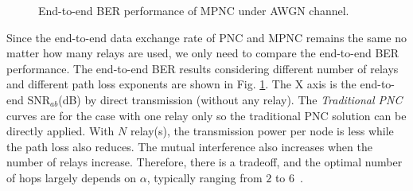 \begin{figure} [th]
    \centering
    \caption{End-to-end BER performance of MPNC under AWGN channel.}\label{ber-D-MPNC}
\end{figure}

Since the end-to-end data exchange rate of PNC and MPNC remains the same no matter how many relays are used, we only need to compare the end-to-end BER performance. 
The end-to-end BER results considering different number of relays and different path loss exponents are shown in Fig. \ref{ber-D-MPNC}. The X axis is the end-to-end $\text{SNR}_{ab}$(dB) by direct transmission (without any relay). The \textit{Traditional PNC} curves are for the case with one relay only so the traditional PNC solution can be directly applied. 
With $N$ relay(s), the transmission power per node is  less while the path loss also reduces. The mutual interference also increases when the number of relays increase. Therefore, there is a tradeoff, and the optimal number of hops largely depends on $\alpha$, typically  ranging  from $2$ to $6$~\cite{goldsmith2005wireless}. 

